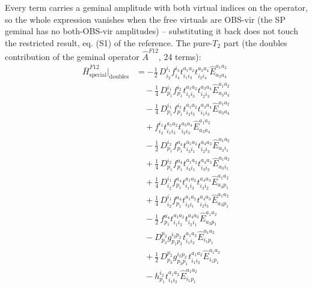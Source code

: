 \documentclass[11pt]{article}
\begin{document}
Every term carries a geminal amplitude with both virtual indices on the operator, so the whole expression vanishes when the free virtuals are OBS-vir (the SP geminal has no both-OBS-vir amplitudes) -- substituting it back does not touch the restricted result, eq. (S1) of the reference.  The pure-$T_2$ part (the doubles contribution of the geminal operator $\hat A^{F12}$, 24 terms):
\begin{align}
\bar H^{F12}_{\mathrm{special}}\Big|_{\mathrm{doubles}} &= - \tfrac{1}{2}\, D^{i_{1}}_{i_{2}} f^{i_{3}}_{i_{4}} t^{a_{1}a_{2}}_{i_{1}i_{3}} t^{a_{3}a_{4}}_{i_{2}i_{4}} \hat{E}^{a_{1}a_{2}}_{a_{3}a_{4}} \\
&\quad - \tfrac{1}{4}\, D^{i_{1}}_{p_{1}} f^{i_{2}}_{p_{1}} t^{a_{1}a_{2}}_{i_{1}i_{3}} t^{a_{3}a_{4}}_{i_{2}i_{3}} \hat{E}^{a_{1}a_{2}}_{a_{3}a_{4}} \\
&\quad - \tfrac{1}{4}\, D^{i_{1}}_{p_{1}} f^{i_{2}}_{p_{1}} t^{a_{1}a_{2}}_{i_{2}i_{3}} t^{a_{3}a_{4}}_{i_{1}i_{3}} \hat{E}^{a_{1}a_{2}}_{a_{3}a_{4}} \\
&\quad + f^{i_{1}}_{i_{2}} t^{a_{1}a_{2}}_{i_{1}i_{3}} t^{a_{3}a_{4}}_{i_{2}i_{3}} \hat{E}^{a_{1}a_{2}}_{a_{3}a_{4}} \\
&\quad - \tfrac{1}{2}\, D^{i_{2}}_{p_{1}} f^{a_{4}}_{p_{1}} t^{a_{1}a_{2}}_{i_{3}i_{1}} t^{a_{4}a_{3}}_{i_{2}i_{3}} \hat{E}^{a_{1}a_{2}}_{a_{3}i_{1}} \\
&\quad + \tfrac{1}{4}\, D^{i_{2}}_{p_{1}} f^{a_{4}}_{p_{1}} t^{a_{1}a_{2}}_{i_{3}i_{1}} t^{a_{4}a_{3}}_{i_{3}i_{2}} \hat{E}^{a_{1}a_{2}}_{a_{3}i_{1}} \\
&\quad + \tfrac{1}{4}\, D^{i_{1}}_{i_{2}} f^{a_{4}}_{p_{1}} t^{a_{1}a_{2}}_{i_{1}i_{3}} t^{a_{4}a_{3}}_{i_{3}i_{2}} \hat{E}^{a_{1}a_{2}}_{a_{3}p_{1}} \\
&\quad + \tfrac{1}{4}\, D^{i_{1}}_{i_{2}} f^{a_{4}}_{p_{1}} t^{a_{1}a_{2}}_{i_{3}i_{1}} t^{a_{4}a_{3}}_{i_{2}i_{3}} \hat{E}^{a_{1}a_{2}}_{a_{3}p_{1}} \\
&\quad - \tfrac{1}{2}\, f^{a_{4}}_{p_{1}} t^{a_{1}a_{2}}_{i_{1}i_{2}} t^{a_{4}a_{3}}_{i_{2}i_{1}} \hat{E}^{a_{1}a_{2}}_{a_{3}p_{1}} \\
&\quad - D^{p_{2}}_{p_{3}} g^{i_{2}p_{2}}_{p_{1}p_{3}} t^{a_{1}a_{2}}_{i_{1}i_{2}} \hat{E}^{a_{1}a_{2}}_{i_{1}p_{1}} \\
&\quad + \tfrac{1}{2}\, D^{p_{2}}_{p_{3}} g^{i_{2}p_{2}}_{p_{3}p_{1}} t^{a_{1}a_{2}}_{i_{1}i_{2}} \hat{E}^{a_{1}a_{2}}_{i_{1}p_{1}} \\
&\quad - h^{i_{2}}_{p_{1}} t^{a_{1}a_{2}}_{i_{1}i_{2}} \hat{E}^{a_{1}a_{2}}_{i_{1}p_{1}} \\

\end{align}
\end{document}
